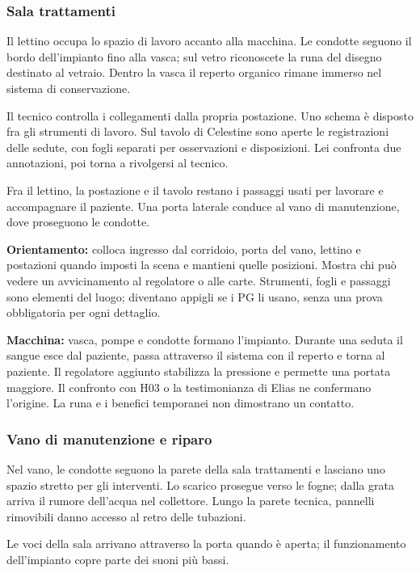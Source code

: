 \documentclass[11pt,a4paper]{article}
\begin{document}
\subsubsection{Sala trattamenti}
\begin{readaloud}
Il lettino occupa lo spazio di lavoro accanto alla macchina. Le condotte seguono il bordo dell'impianto fino alla vasca; sul vetro riconoscete la runa del disegno destinato al vetraio. Dentro la vasca il reperto organico rimane immerso nel sistema di conservazione.

Il tecnico controlla i collegamenti dalla propria postazione. Uno schema è disposto fra gli strumenti di lavoro. Sul tavolo di Celestine sono aperte le registrazioni delle sedute, con fogli separati per osservazioni e disposizioni. Lei confronta due annotazioni, poi torna a rivolgersi al tecnico.

Fra il lettino, la postazione e il tavolo restano i passaggi usati per lavorare e accompagnare il paziente. Una porta laterale conduce al vano di manutenzione, dove proseguono le condotte.
\end{readaloud}

\textbf{Orientamento:} colloca ingresso dal corridoio, porta del vano, lettino e postazioni quando imposti la scena e mantieni quelle posizioni. Mostra chi può vedere un avvicinamento al regolatore o alle carte. Strumenti, fogli e passaggi sono elementi del luogo; diventano appigli se i PG li usano, senza una prova obbligatoria per ogni dettaglio.

\textbf{Macchina:} vasca, pompe e condotte formano l'impianto. Durante una seduta il sangue esce dal paziente, passa attraverso il sistema con il reperto e torna al paziente. Il regolatore aggiunto stabilizza la pressione e permette una portata maggiore. Il confronto con H03 o la testimonianza di Elias ne confermano l'origine. La runa e i benefici temporanei non dimostrano un contatto.

\subsubsection{Vano di manutenzione e riparo}
\begin{readaloud}
Nel vano, le condotte seguono la parete della sala trattamenti e lasciano uno spazio stretto per gli interventi. Lo scarico prosegue verso le fogne; dalla grata arriva il rumore dell'acqua nel collettore. Lungo la parete tecnica, pannelli rimovibili danno accesso al retro delle tubazioni.

Le voci della sala arrivano attraverso la porta quando è aperta; il funzionamento dell'impianto copre parte dei suoni più bassi.
\end{readaloud}
\end{document}
